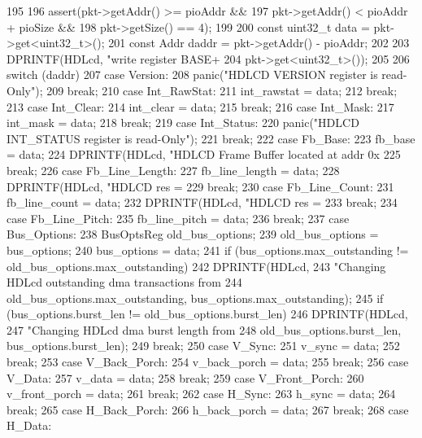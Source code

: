 \begin{DoxyCode}
195 {
196     assert(pkt->getAddr() >= pioAddr &&
197            pkt->getAddr() < pioAddr + pioSize &&
198            pkt->getSize() == 4);
199 
200     const uint32_t data = pkt->get<uint32_t>();
201     const Addr daddr = pkt->getAddr() - pioAddr;
202 
203     DPRINTF(HDLcd, "write register BASE+%
204             pkt->get<uint32_t>());
205 
206     switch (daddr) {
207       case Version:
208         panic("HDLCD VERSION register is read-Only\n");
209         break;
210       case Int_RawStat:
211         int_rawstat = data;
212         break;
213       case Int_Clear:
214         int_clear = data;
215         break;
216       case Int_Mask:
217         int_mask = data;
218         break;
219       case Int_Status:
220         panic("HDLCD INT_STATUS register is read-Only\n");
221         break;
222       case Fb_Base:
223         fb_base = data;
224         DPRINTF(HDLcd, "HDLCD Frame Buffer located at addr 0x%
225         break;
226       case Fb_Line_Length:
227         fb_line_length = data;
228         DPRINTF(HDLcd, "HDLCD res = %
229         break;
230       case Fb_Line_Count:
231         fb_line_count = data;
232         DPRINTF(HDLcd, "HDLCD res = %
233         break;
234       case Fb_Line_Pitch:
235         fb_line_pitch = data;
236         break;
237       case Bus_Options: {
238         BusOptsReg old_bus_options;
239         old_bus_options = bus_options;
240         bus_options = data;
241         if (bus_options.max_outstanding != old_bus_options.max_outstanding)
242             DPRINTF(HDLcd,
243                 "Changing HDLcd outstanding dma transactions from %
244                 old_bus_options.max_outstanding, bus_options.max_outstanding);
245         if (bus_options.burst_len != old_bus_options.burst_len)
246             DPRINTF(HDLcd,
247                 "Changing HDLcd dma burst length from %
248                 old_bus_options.burst_len, bus_options.burst_len); }
249         break;
250       case V_Sync:
251         v_sync = data;
252         break;
253       case V_Back_Porch:
254         v_back_porch = data;
255         break;
256       case V_Data:
257         v_data = data;
258         break;
259       case V_Front_Porch:
260         v_front_porch = data;
261         break;
262       case H_Sync:
263         h_sync = data;
264         break;
265       case H_Back_Porch:
266         h_back_porch = data;
267         break;
268       case H_Data:
}}
\end{DoxyCode}
